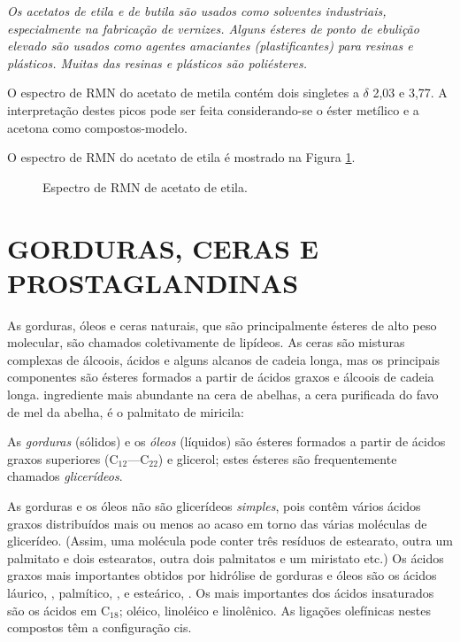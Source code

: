 \emph{Os acetatos de etila e de butila são usados como solventes industriais, especialmente na fabricação de vernizes. Alguns ésteres de ponto de ebulição elevado são usados como agentes amaciantes (plastificantes) para resinas e plásticos. Muitas das resinas e plásticos são poliésteres.}

\par\bigskip

O espectro de RMN do acetato de metila contém dois singletes a $\delta$ 2,03 e 3,77. A interpretação destes picos pode ser feita considerando-se o éster metílico e a acetona como compostos-modelo.

\begin{tightcenter}
  \qquad
  \qquad
\end{tightcenter}

O espectro de RMN do acetato de etila é mostrado na Figura \ref{fig8_6}.

\begin{figure}[H]
    \centering
    \caption{Espectro de RMN de acetato de etila.}
    \label{fig8_6}
\end{figure}

\section{GORDURAS, CERAS E PROSTAGLANDINAS}

 As gorduras, óleos e ceras naturais, que são principalmente ésteres de alto peso molecular, são chamados coletivamente de lipídeos. As ceras são misturas complexas de álcoois, ácidos e alguns alcanos de cadeia longa, mas os principais componentes são ésteres formados a partir de ácidos graxos e álcoois de cadeia longa. ingrediente mais abundante na cera de abelhas, a cera purificada do favo de mel da abelha, é o palmitato de miricila:

 \begin{tightcenter}
 \end{tightcenter}

\noindent As \textit{gorduras} (sólidos) e os \textit{óleos} (líquidos) são ésteres formados a partir de ácidos graxos superiores (C$_{12}$—C$_{22}$) e glicerol; estes ésteres são frequentemente chamados \textit{glicerídeos}.


As gorduras e os óleos não são glicerídeos \textit{simples}, pois contêm vários ácidos graxos distribuídos mais ou menos ao acaso em torno das várias moléculas de glicerídeo. (Assim, uma molécula pode conter três resíduos de estearato, outra um palmitato e dois estearatos, outra dois palmitatos e um miristato etc.) Os ácidos graxos mais importantes obtidos por hidrólise de gorduras e óleos são os ácidos láurico, , palmítico, , e esteárico, . Os mais importantes dos ácidos insaturados são os ácidos em C$_{18}$; oléico, linoléico e linolênico. As ligações olefínicas nestes compostos têm a configuração cis.

